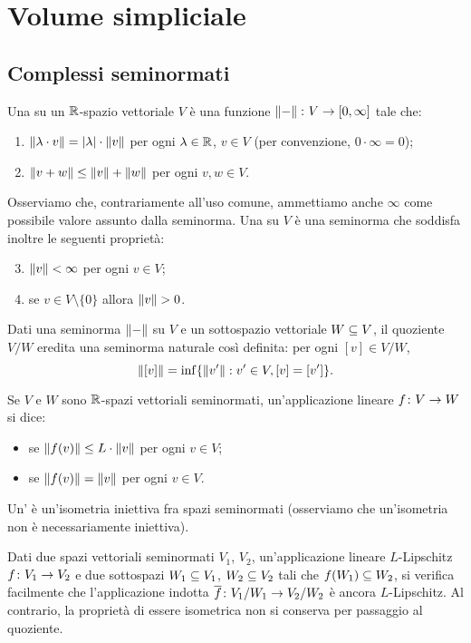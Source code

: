 \section{Volume simpliciale}

\subsection{Complessi seminormati}

\begin{definition}
Una  su un $\mathbb{R}$-spazio vettoriale $V$ è una funzione $\map{\norm{-}}{V}{[0,\infty]}$ tale che:
\begin{enumerate}
\item $\left\lVert \lambda\cdot v\right\rVert=|\lambda|\cdot\left\lVert v\right\rVert$ per ogni $\lambda\in\mathbb{R}$, $v\in V$ (per convenzione, $0\cdot\infty=0$);
\item $\left\lVert v+w\right\rVert\le\left\lVert v\right\rVert+\left\lVert w\right\rVert$ per ogni $v,w\in V$.
\end{enumerate}
\end{definition}
Osserviamo che, contrariamente all'uso comune, ammettiamo anche $\infty$ come possibile valore assunto dalla seminorma. Una  su $V$ è una seminorma che soddisfa inoltre le seguenti proprietà:
\begin{enumerate}
\setcounter{enumi}{2}
\item $\left\lVert v\right\rVert<\infty$ per ogni $v\in V$;
\item se $v\in V\setminus\{0\}$ allora $\left\lVert v\right\rVert>0$.
\end{enumerate}

Dati una seminorma $\left\lVert -\right\rVert$ su $V$ e un sottospazio vettoriale $W\subseteq V$, il quoziente $V/W$ eredita una seminorma naturale così definita: per ogni $[v]\in V/W$,
\[
\left\lVert [v]\right\rVert=\inf\{\left\lVert v'\right\rVert:v'\in V,[v]=[v']\}.
\]

Se $V$ e $W$ sono $\mathbb{R}$-spazi vettoriali seminormati, un'applicazione lineare $\map{f}{V}{W}$ si dice:
\begin{itemize}
\item {} se $\left\lVert f(v)\right\rVert\le L\cdot\left\lVert v\right\rVert$ per ogni $v\in V$;
\item {} se $\left\lVert f(v)\right\rVert=\left\lVert v\right\rVert$ per ogni $v\in V$.
\end{itemize}
Un' è un'isometria iniettiva fra spazi seminormati (osserviamo che un'isometria non è necessariamente iniettiva).

Dati due spazi vettoriali seminormati $V_1$, $V_2$, un'applicazione lineare $L$-Lipschitz $\map{f}{V_1}{V_2}$ e due sottospazi $W_1\subseteq V_1$, $W_2\subseteq V_2$ tali che $f(W_1)\subseteq W_2$, si verifica facilmente che l'applicazione indotta $\map{\overline{f}}{V_1/W_1}{V_2/W_2}$ è ancora $L$-Lipschitz. Al contrario, la proprietà di essere isometrica non si conserva per passaggio al quoziente.

